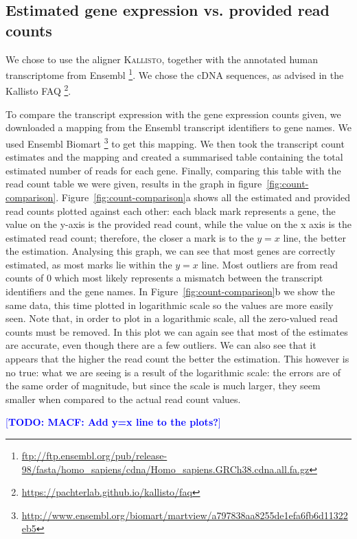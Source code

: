 \documentclass[10pt,twocolumn]{article}\usepackage[]{graphicx}\usepackage[]{color}
\newcommand{\footurl}[1]{\footnote{\url{#1}}}
\newcommand{\todo}[1]{\textcolor{blue}{[\textbf{TODO: #1}]} }
\begin{document}
\subsection{Estimated gene expression vs. provided read counts}
We chose to use the aligner \textsc{Kallisto}, together with the annotated human transcriptome from Ensembl \footurl{ftp://ftp.ensembl.org/pub/release-98/fasta/homo_sapiens/cdna/Homo_sapiens.GRCh38.cdna.all.fa.gz}.
We chose the cDNA sequences, as advised in the Kallisto FAQ \footurl{https://pachterlab.github.io/kallisto/faq}.

To compare the transcript expression with the gene expression counts given, we downloaded a mapping from the Ensembl transcript identifiers to gene names. We used  Ensembl Biomart \footurl{http://www.ensembl.org/biomart/martview/a797838aa8255de1efa6fb6d11322eb5} to get this mapping. We then took the transcript count estimates and the mapping and created a summarised table containing the total estimated number of reads for each gene. Finally, comparing this table with the read count table we were given, results in the graph in figure~\ref{fig:count-comparison}. Figure~\ref{fig:count-comparison}a shows all the estimated and provided read counts plotted against each other: each black mark represents a gene, the value on the y-axis is the provided read count, while the value on the x axis is the estimated read count; therefore, the closer a mark is to the \(y=x\) line, the better the estimation. Analysing this graph, we can see that most genes are correctly estimated, as most marks lie within the \(y=x\) line. Most outliers are from read counts of 0 which most likely represents a mismatch between the transcript identifiers and the gene names. In Figure~\ref{fig:count-comparison}b we show the same data, this time plotted in logarithmic scale so the values are more easily seen. Note that, in order to plot in a logarithmic scale, all the zero-valued read counts must be removed. In this plot we can again see that most of the estimates are accurate, even though there are a few outliers. We can also see that it appears that the higher the read count the better the estimation. This however is no true: what we are seeing is a result of the logarithmic scale: the errors are of the same order of magnitude, but since the scale is much larger, they seem smaller when compared to the actual read count values.

\todo{MACF: Add y=x line to the plots?}
\end{document}
